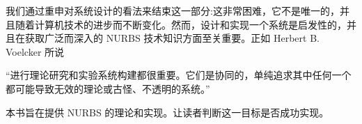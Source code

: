 \documentclass[../main.tex]{subfiles}
\begin{document}
我们通过重申对系统设计的看法来结束这一部分:这非常困难，它不是唯一的，并且随着计算机技术的进步而不断变化。然而，设计和实现一个系统是启发性的，并且在获取广泛而深入的 NURBS 技术知识方面至关重要。正如 Herbert B. Voelcker 所说 \cite{Pieg93}

“进行理论研究和实验系统构建都很重要。它们是协同的，单纯追求其中任何一个都可能导致无效的理论或古怪、不透明的系统。”

本书旨在提供 NURBS 的理论和实现。让读者判断这一目标是否成功实现。


\clearpage
    
\end{document}
